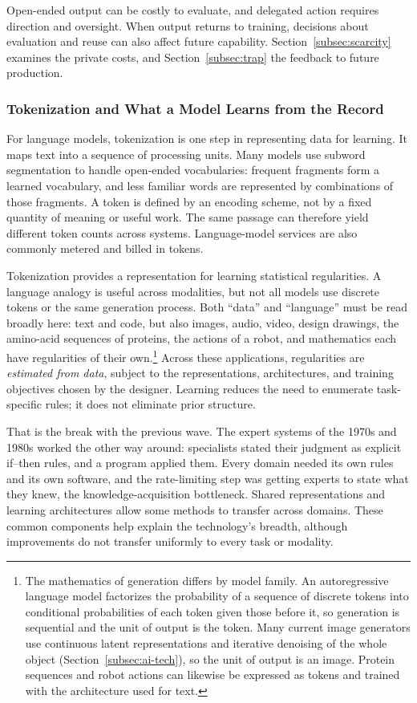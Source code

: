 \documentclass[12pt]{article}
\theoremstyle{plain}
\theoremstyle{definition}
\theoremstyle{remark}
\begin{document}
Open-ended output can be costly to evaluate, and delegated action
requires direction and oversight. When output returns to training,
decisions about evaluation and reuse can also affect future capability. Section~\ref{subsec:scarcity}
examines the private costs, and Section~\ref{subsec:trap} the feedback
to future production.

\subsubsection{Tokenization and What a Model Learns from the Record}

For language models, tokenization is one step in representing data
for learning. It maps text into a sequence of processing units. Many
models use subword segmentation to handle open-ended vocabularies:
frequent fragments form a learned vocabulary, and less familiar words
are represented by combinations of those fragments. A token is defined
by an encoding
scheme, not by a fixed quantity of meaning or useful work. The same
passage can therefore yield different token counts across systems.
Language-model services are also commonly metered and billed in
tokens.

Tokenization provides a representation for learning statistical
regularities. A language analogy is useful across modalities, but not
all models use discrete tokens or the same generation process.
Both ``data'' and ``language'' must be read broadly here: text and code,
but also images, audio, video, design drawings, the amino-acid sequences
of proteins, the actions of a robot, and mathematics each have
regularities of their own.\footnote{%
The mathematics of generation differs by model family. An
autoregressive language model factorizes the probability of a sequence
of discrete tokens into
conditional probabilities of each token given those before it, so
generation is sequential and the unit of
output is the token. Many current image generators use continuous latent
representations and iterative denoising of the whole object
(Section~\ref{subsec:ai-tech}), so the unit of output is an image.
Protein sequences and robot actions can likewise be expressed as tokens
and trained with the architecture used for text.}
Across these applications, regularities are \emph{estimated from
data}, subject to the representations, architectures, and training
objectives chosen by the designer. Learning reduces the need to
enumerate task-specific rules; it does not eliminate prior structure.

That is the break with the previous wave. The expert systems of the
1970s and 1980s worked the other way around: specialists stated their
judgment as explicit if--then rules, and a program applied them. Every
domain needed its
own rules and its own software, and the rate-limiting step was getting
experts to state what they knew, the knowledge-acquisition bottleneck.
Shared representations and learning architectures allow some methods
to transfer across domains. These common components help explain the
technology's breadth, although improvements do not transfer uniformly
to every task or modality.
\end{document}
